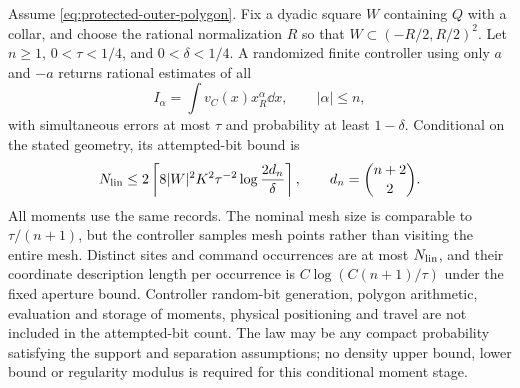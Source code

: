 \begin{theorem}
\label{thm:linear-moment-sampling}
Assume \eqref{eq:protected-outer-polygon}. Fix a dyadic square $W$
containing $Q$ with a collar, and choose the rational normalization
$R$ so that $W\subset(-R/2,R/2)^2$. Let $n\ge1$,
$0<\tau<1/4$, and $0<\delta<1/4$. A randomized finite controller
using only $a$ and $-a$ returns rational estimates of all
\[
 I_\alpha=\int v_C(x)x_R^\alpha\dd x,
                   \qquad |\alpha|\le n,
\]
with simultaneous errors at most $\tau$ and probability at least
$1-\delta$. Conditional on the stated geometry, its attempted-bit
bound is
\begin{equation}\label{eq:linear-moment-cost}
 N_{\rm lin}\le
 2\left\lceil 8|W|^2K^2\tau^{-2}
                 \log\frac{2d_n}{\delta}\right\rceil,
        \qquad d_n=\binom{n+2}{2}.
\end{equation}
All moments use the same records. The nominal mesh size is comparable
to $\tau/(n+1)$, but the controller samples mesh points rather than
visiting the entire mesh. Distinct sites and command occurrences
are at most $N_{\rm lin}$, and their coordinate description length
per occurrence is $C\log(C(n+1)/\tau)$ under the fixed aperture
bound. Controller random-bit generation, polygon arithmetic,
evaluation and storage of moments, physical positioning and travel
are not included in the attempted-bit count. The law may be any
compact probability satisfying the support and separation assumptions;
no density upper bound, lower bound or regularity modulus is required
for this conditional moment stage.
\end{theorem}
